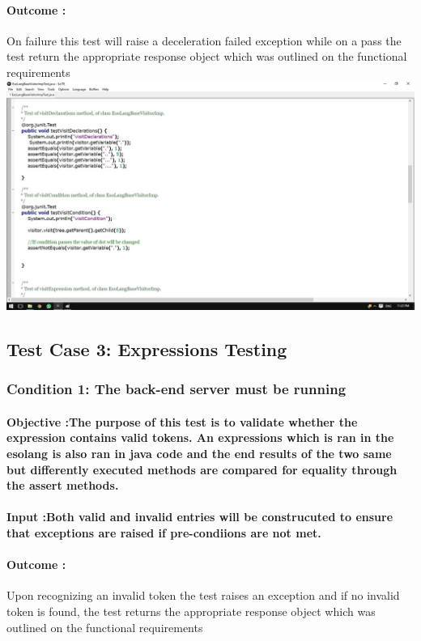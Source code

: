 \documentclass[english]{article}
\begin{document}
			\paragraph{Outcome :} On failure this test will raise a deceleration failed exception while on a pass the test return the  appropriate response object  which was outlined on the functional requirements  \\
			\includegraphics[width=\linewidth]{test2.jpg}
			\\[12pt]	
			
			\subsection{Test Case 3: Expressions Testing}
			\subsubsection{Condition 1: The back-end server must be running}
			\paragraph{Objective :The purpose of this test is to validate whether the expression contains valid tokens. An expressions which is ran in the esolang is also ran in java code and the end results of the two same but differently executed methods are compared for equality through the assert methods.}
			\paragraph{Input :Both valid and invalid entries will be construcuted to ensure that exceptions are raised if pre-condiions are not met.}
			\paragraph{Outcome :} Upon recognizing an invalid token the test raises an exception and if no invalid token is found, the test returns the  appropriate response object  which was outlined on the functional requirements  \\
				
\end{document}
